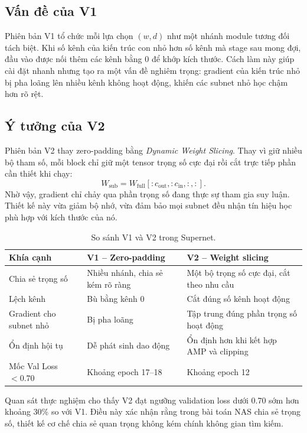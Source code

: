 \subsection{Vấn đề của V1}

Phiên bản V1 tổ chức mỗi lựa chọn \((w, d)\) như một nhánh module tương đối tách biệt. Khi số kênh của kiến trúc con nhỏ hơn số kênh mà stage sau mong đợi, đầu vào được nối thêm các kênh bằng 0 để khớp kích thước. Cách làm này giúp cài đặt nhanh nhưng tạo ra một vấn đề nghiêm trọng: gradient của kiến trúc nhỏ bị pha loãng lên nhiều kênh không hoạt động, khiến các subnet nhỏ học chậm hơn rõ rệt.

\subsection{Ý tưởng của V2}

Phiên bản V2 thay zero-padding bằng \textit{Dynamic Weight Slicing}. Thay vì giữ nhiều bộ tham số, mỗi block chỉ giữ một tensor trọng số cực đại rồi cắt trực tiếp phần cần thiết khi chạy:
\[
W_{\text{sub}} = W_{\text{full}}\left[:c_{\text{out}}, :c_{\text{in}}, :, :\right].
\]
Nhờ vậy, gradient chỉ chảy qua phần trọng số đang thực sự tham gia suy luận. Thiết kế này vừa giảm bộ nhớ, vừa đảm bảo mọi subnet đều nhận tín hiệu học phù hợp với kích thước của nó.

\begin{table}[H]
\centering
\caption{So sánh V1 và V2 trong Supernet.}
\begin{tabular}{@{}p{}p{}p{}@{}}
\toprule
\textbf{Khía cạnh} & \textbf{V1 -- Zero-padding} & \textbf{V2 -- Weight slicing} \\
\midrule
Chia sẻ trọng số & Nhiều nhánh, chia sẻ kém rõ ràng & Một bộ trọng số cực đại, cắt theo nhu cầu \\
Lệch kênh & Bù bằng kênh 0 & Cắt đúng số kênh hoạt động \\
Gradient cho subnet nhỏ & Bị pha loãng & Tập trung đúng phần trọng số hoạt động \\
Ổn định hội tụ & Dễ phát sinh dao động & Ổn định hơn khi kết hợp AMP và clipping \\
Mốc Val Loss \(<0.70\) & Khoảng epoch 17--18 & Khoảng epoch 12 \\
\bottomrule
\end{tabular}
\end{table}

Quan sát thực nghiệm cho thấy V2 đạt ngưỡng validation loss dưới 0.70 sớm hơn khoảng 30\% so với V1. Điều này xác nhận rằng trong bài toán NAS chia sẻ trọng số, thiết kế cơ chế chia sẻ quan trọng không kém chính không gian tìm kiếm.

